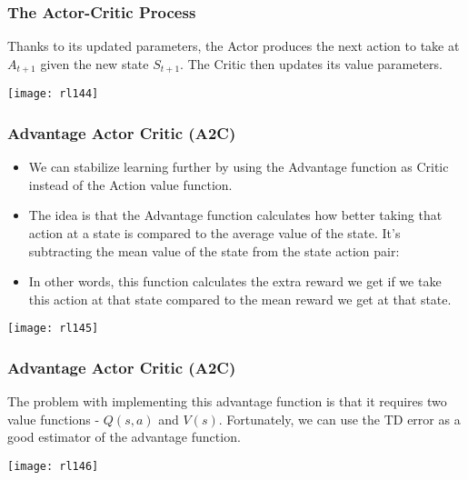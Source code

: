 \begin{frame}[fragile]\frametitle{The Actor-Critic Process}

Thanks to its updated parameters, the Actor produces the next action to take at $A_{t+1}$  given the new state $S_{t+1}$. The Critic then updates its value parameters.	
\begin{center}
\texttt{[image: rl144]}
\end{center}
\end{frame}


\begin{frame}[fragile]\frametitle{Advantage Actor Critic (A2C)}

\begin{itemize}
\item We can stabilize learning further by using the Advantage function as Critic instead of the Action value function.
\item The idea is that the Advantage function calculates how better taking that action at a state is compared to the average value of the state. It's subtracting the mean value of the state from the state action pair:
\item In other words, this function calculates the extra reward we get if we take this action at that state compared to the mean reward we get at that state.
\end{itemize}


\begin{center}
\texttt{[image: rl145]}
\end{center}



\end{frame}

\begin{frame}[fragile]\frametitle{Advantage Actor Critic (A2C)}

The problem with implementing this advantage function is that it requires two value functions - $Q(s,a)$ and $V(s)$. Fortunately, we can use the TD error as a good estimator of the advantage function.

\begin{center}
\texttt{[image: rl146]}
\end{center}


\end{frame}


